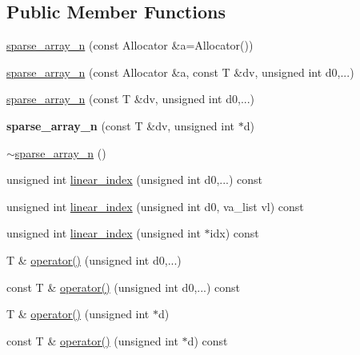 \subsection*{Public Member Functions}
\begin{DoxyCompactItemize}
\item 
\hyperlink{classsisl_1_1sparse__array__n_a8c957cdf94a178f0d77c1c3c374f1f91}{sparse\+\_\+array\+\_\+n} (const Allocator \&a=Allocator())
\item 
\hyperlink{classsisl_1_1sparse__array__n_afd76d3fbb0e923e2b28cfba1c675482b}{sparse\+\_\+array\+\_\+n} (const Allocator \&a, const T \&dv, unsigned int d0,...)
\item 
\hyperlink{classsisl_1_1sparse__array__n_a3132fb2f99e33ea6c34129eb1a02523f}{sparse\+\_\+array\+\_\+n} (const T \&dv, unsigned int d0,...)
\item 
\mbox{\label{classsisl_1_1sparse__array__n_a8cffd9aaa7d7ea15fdc5071dd3ddbac7}} 
{\bfseries sparse\+\_\+array\+\_\+n} (const T \&dv, unsigned int $\ast$d)
\item 
\hyperlink{classsisl_1_1sparse__array__n_ae639c5c814a4649fcfa5ea2616e51f12}{$\sim$sparse\+\_\+array\+\_\+n} ()
\item 
unsigned int \hyperlink{classsisl_1_1sparse__array__n_a4418f97d93ce2a6cef4639ed371ee47e}{linear\+\_\+index} (unsigned int d0,...) const
\item 
unsigned int \hyperlink{classsisl_1_1sparse__array__n_a43cf90a26a41032cfc091ebb45112d13}{linear\+\_\+index} (unsigned int d0, va\+\_\+list vl) const
\item 
unsigned int \hyperlink{classsisl_1_1sparse__array__n_a39aa26464a84f3895ab34b55f5925175}{linear\+\_\+index} (unsigned int $\ast$idx) const
\item 
T \& \hyperlink{classsisl_1_1sparse__array__n_a828d9cd11de929845c584d469b4cfb0d}{operator()} (unsigned int d0,...)
\item 
const T \& \hyperlink{classsisl_1_1sparse__array__n_a37b840c55a4225232fdc8852a1a068dd}{operator()} (unsigned int d0,...) const
\item 
T \& \hyperlink{classsisl_1_1sparse__array__n_a21e3bb0965fa54371ad65e6c5cc10520}{operator()} (unsigned int $\ast$d)
\item 
const T \& \hyperlink{classsisl_1_1sparse__array__n_ad7ab70c556272a847c076ff5f3a2ad26}{operator()} (unsigned int $\ast$d) const
\item 
\mbox{\label{classsisl_1_1sparse__array__n_a7db3ee8940017e21e3673641071f9654}} 

\end{DoxyCompactItemize}
